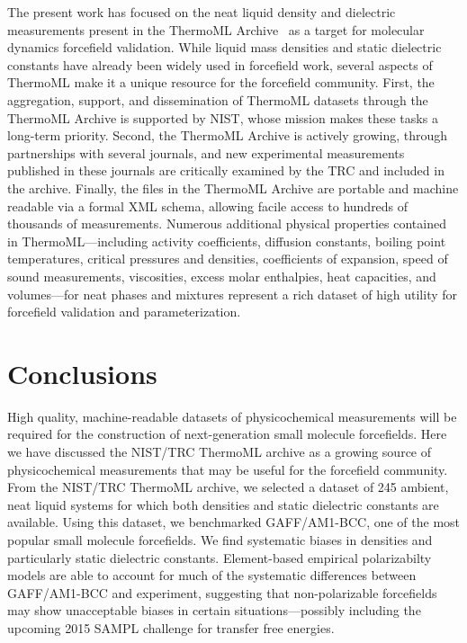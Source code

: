 \documentclass[aps,pre,twocolumn,nofootinbib,superscriptaddress,linenumbers]{revtex4-1}
\begin{document}
The present work has focused on the neat liquid density and dielectric measurements present in the ThermoML Archive~\cite{frenkel2006xml, frenkel2003thermoml, chirico2003thermoml} as a target for molecular dynamics forcefield validation.  
While liquid mass densities and static dielectric constants have already been widely used in forcefield work, several aspects of ThermoML make it a unique resource for the forcefield community.  
First, the aggregation, support, and dissemination of ThermoML datasets through the ThermoML Archive is supported by NIST, whose mission makes these tasks a long-term priority.  
Second, the ThermoML Archive is actively growing, through partnerships with several journals, and new experimental measurements published in these journals are critically examined by the TRC and included in the archive.  
Finally, the files in the ThermoML Archive are portable and machine readable via a formal XML schema, allowing facile access to hundreds of thousands of measurements.  
Numerous additional physical properties contained in ThermoML---including activity coefficients, diffusion constants, boiling point temperatures, critical pressures and densities, coefficients of expansion, speed of sound measurements, viscosities, excess molar enthalpies, heat capacities, and volumes---for neat phases and mixtures represent a rich dataset of high utility for forcefield validation and parameterization.


\section{Conclusions}

High quality, machine-readable datasets of physicochemical measurements will be required for the construction of next-generation small molecule forcefields.  
Here we have discussed the NIST/TRC ThermoML archive as a growing source of physicochemical measurements that may be useful for the forcefield community.
From the NIST/TRC ThermoML archive, we selected a dataset of 245 ambient, neat liquid systems for which both densities and static dielectric constants are available.  
Using this dataset, we benchmarked GAFF/AM1-BCC, one of the most popular small molecule forcefields.
We find systematic biases in densities and particularly static dielectric constants.
Element-based empirical polarizabilty models are able to account for much of the systematic differences between GAFF/AM1-BCC and experiment, 
suggesting that non-polarizable forcefields may show unacceptable biases in certain situations---possibly including the upcoming 2015 SAMPL challenge for transfer free energies.  
\end{document}
